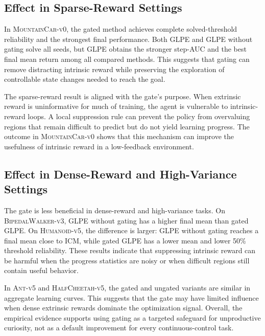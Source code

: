 \subsection{Effect in Sparse-Reward Settings}
\label{subsec:results_gate_sparse_reward}

In \textsc{MountainCar-v0}, the gated method achieves complete solved-threshold reliability and the strongest final performance.
Both GLPE and GLPE without gating solve all seeds, but GLPE obtains the stronger step-AUC and the best final mean return among all compared methods.
This suggests that gating can remove distracting intrinsic reward while preserving the exploration of controllable state changes needed to reach the goal.

The sparse-reward result is aligned with the gate's purpose.
When extrinsic reward is uninformative for much of training, the agent is vulnerable to intrinsic-reward loops.
A local suppression rule can prevent the policy from overvaluing regions that remain difficult to predict but do not yield learning progress.
The outcome in \textsc{MountainCar-v0} shows that this mechanism can improve the usefulness of intrinsic reward in a low-feedback environment.

\subsection{Effect in Dense-Reward and High-Variance Settings}
\label{subsec:results_gate_dense_high_variance}

The gate is less beneficial in dense-reward and high-variance tasks.
On \textsc{BipedalWalker-v3}, GLPE without gating has a higher final mean than gated GLPE.
On \textsc{Humanoid-v5}, the difference is larger: GLPE without gating reaches a final mean close to ICM, while gated GLPE has a lower mean and lower 50\% threshold reliability.
These results indicate that suppressing intrinsic reward can be harmful when the progress statistics are noisy or when difficult regions still contain useful behavior.

In \textsc{Ant-v5} and \textsc{HalfCheetah-v5}, the gated and ungated variants are similar in aggregate learning curves.
This suggests that the gate may have limited influence when dense extrinsic rewards dominate the optimization signal.
Overall, the empirical evidence supports using gating as a targeted safeguard for unproductive curiosity, not as a default improvement for every continuous-control task.

\FloatBarrier